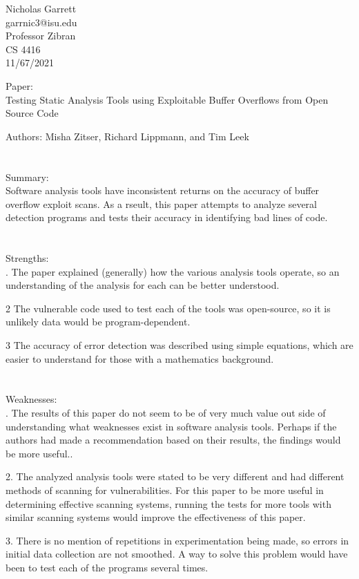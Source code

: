 \documentclass[12pt, a4paper]{article}
\begin{document}
\noindent
Nicholas Garrett\\
garrnic3@isu.edu\\ 
Professor Zibran \\
CS 4416\\
11/67/2021 \\


\begin{center}
\end{center}

\noindent
Paper:\\
	\indent
	Testing Static Analysis Tools using Exploitable Buffer Overflows from Open Source Code

	Authors: Misha Zitser, Richard Lippmann, and Tim Leek\\ \\ \\
	
\noindent	
Summary:\\
	\indent
	Software analysis tools have inconsistent returns on the accuracy of buffer overflow exploit scans.  As a rseult, this paper attempts to analyze several detection programs and tests their accuracy in identifying bad lines of code. 	  \\ \\ \\

\noindent
Strengths:\\
.  The paper explained (generally) how the various analysis tools operate, so an understanding of the analysis for each can be better understood.

	2  The vulnerable code used to test each of the tools was open-source, so it is unlikely data would be program-dependent. 

	3  The accuracy of error detection was described using simple equations, which are easier to understand for those with a mathematics background. \\ \\ \\

\noindent
Weaknesses: \\
. The results of this paper do not seem to be of very much value out side of understanding what weaknesses exist in software analysis tools.  Perhaps if the authors had made a recommendation based on their results, the findings would be more useful..

	2.  The analyzed analysis tools were stated to be very different and had different methods of scanning for vulnerabilities.  For this paper to be more useful in determining effective scanning systems, running the tests for more tools with similar scanning systems would improve the effectiveness of this paper.   

	3.  There is no mention of repetitions in experimentation being made, so errors in initial data collection are not smoothed.  A way to solve this problem would have been to test each of the programs several times.
\end{document}
